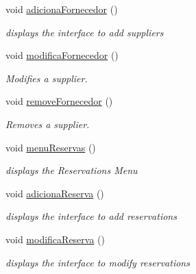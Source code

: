 \begin{DoxyCompactItemize}
void \hyperlink{classEmpresa_af20261a3f95a5dd0c4a5a796d9a3d442}{adiciona\+Fornecedor} ()
\begin{DoxyCompactList}\small\item\em displays the interface to add suppliers \end{DoxyCompactList}\item 
\mbox{\label{classEmpresa_aa0470e1fd4f41615a230fc8048b8b321}} 
void \hyperlink{classEmpresa_aa0470e1fd4f41615a230fc8048b8b321}{modifica\+Fornecedor} ()
\begin{DoxyCompactList}\small\item\em Modifies a supplier. \end{DoxyCompactList}\item 
\mbox{\label{classEmpresa_a9aa7b7e699971eb2e28f0db99c6500c4}} 
void \hyperlink{classEmpresa_a9aa7b7e699971eb2e28f0db99c6500c4}{remove\+Fornecedor} ()
\begin{DoxyCompactList}\small\item\em Removes a supplier. \end{DoxyCompactList}\item 
\mbox{\label{classEmpresa_a0d362cb7362b859ccf99b9603de6b603}} 
void \hyperlink{classEmpresa_a0d362cb7362b859ccf99b9603de6b603}{menu\+Reservas} ()
\begin{DoxyCompactList}\small\item\em displays the Reservations Menu \end{DoxyCompactList}\item 
\mbox{\label{classEmpresa_a42953bdbb2fb39173ad6f38892fc122b}} 
void \hyperlink{classEmpresa_a42953bdbb2fb39173ad6f38892fc122b}{adiciona\+Reserva} ()
\begin{DoxyCompactList}\small\item\em displays the interface to add reservations \end{DoxyCompactList}\item 
\mbox{\label{classEmpresa_ae74f80c120a14f0591d04fe7603e6905}} 
void \hyperlink{classEmpresa_ae74f80c120a14f0591d04fe7603e6905}{modifica\+Reserva} ()
\begin{DoxyCompactList}\small\item\em displays the interface to modify reservations \end{DoxyCompactList}\item 

\end{DoxyCompactItemize}
